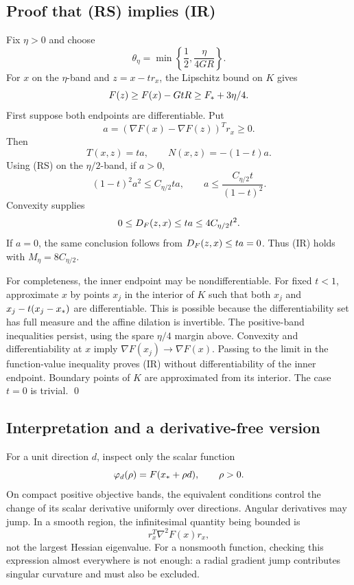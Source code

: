 

\subsection{Proof that (RS) implies (IR)}
Fix $\eta>0$ and choose
\[
 \theta_\eta=\min\left\{\frac12,\frac{\eta}{4GR}\right\}.
\]
For $x$ on the $\eta$-band and $z=x-t r_x$, the Lipschitz bound on $K$ gives
\[
 F(z)\ge F(x)-GtR\ge F_*+3\eta/4.
\]
First suppose both endpoints are differentiable. Put
\[
 a=(\nabla F(x)-\nabla F(z))^Tr_x\ge0.
\]
Then
\[
 T(x,z)=ta,\qquad N(x,z)=-(1-t)a.
\]
Using (RS) on the $\eta/2$-band, if $a>0$,
\[
 (1-t)^2a^2\le C_{\eta/2}ta,
 \qquad
 a\le\frac{C_{\eta/2}t}{(1-t)^2}.
\]
Convexity supplies
\[
 0\le D_F(z,x)\le ta\le4C_{\eta/2}t^2.
\]
If $a=0$, the same conclusion follows from $D_F(z,x)\le ta=0$. Thus (IR) holds with $M_\eta=8C_{\eta/2}$.

For completeness, the inner endpoint may be nondifferentiable. For fixed $t<1$, approximate $x$ by points $x_j$ in the interior of $K$ such that both $x_j$ and $x_j-t(x_j-x_*)$ are differentiable. This is possible because the differentiability set has full measure and the affine dilation is invertible. The positive-band inequalities persist, using the spare $\eta/4$ margin above. Convexity and differentiability at $x$ imply $\nabla F(x_j)\to\nabla F(x)$. Passing to the limit in the function-value inequality proves (IR) without differentiability of the inner endpoint. Boundary points of $K$ are approximated from its interior. The case $t=0$ is trivial. \qed



\subsection{Interpretation and a derivative-free version}
For a unit direction $d$, inspect only the scalar function
\[
 \varphi_d(\rho)=F(x_*+\rho d),\qquad \rho>0.
\]
On compact positive objective bands, the equivalent conditions control the change of its scalar derivative uniformly over directions. Angular derivatives may jump. In a smooth region, the infinitesimal quantity being bounded is
\[
 r_x^T\nabla^2F(x)r_x,
\]
not the largest Hessian eigenvalue. For a nonsmooth function, checking this expression almost everywhere is not enough: a radial gradient jump contributes singular curvature and must also be excluded.

